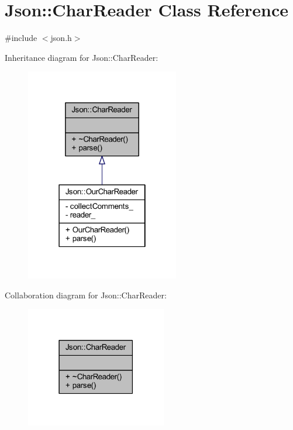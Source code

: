 \hypertarget{class_json_1_1_char_reader}{}\section{Json\+:\+:Char\+Reader Class Reference}
\label{class_json_1_1_char_reader}


{\ttfamily \#include $<$json.\+h$>$}



Inheritance diagram for Json\+:\+:Char\+Reader\+:\nopagebreak
\begin{figure}[H]
\begin{center}
\leavevmode
\includegraphics[width=190pt]{class_json_1_1_char_reader__inherit__graph}
\end{center}
\end{figure}


Collaboration diagram for Json\+:\+:Char\+Reader\+:\nopagebreak
\begin{figure}[H]
\begin{center}
\leavevmode
\includegraphics[width=174pt]{class_json_1_1_char_reader__coll__graph}
\end{center}
\end{figure}
